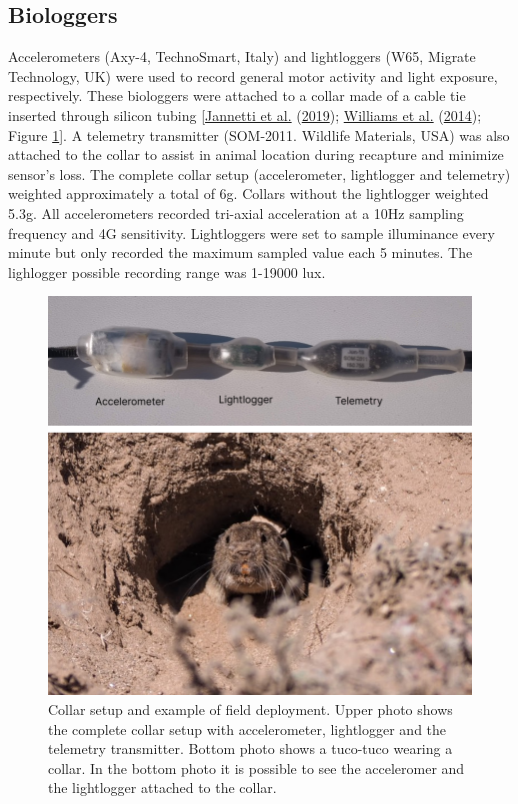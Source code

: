 \documentclass[msc,numbers,hidelinks]{coppe}
\begin{document}
  \hypertarget{biologgers}{%
  \subsection{Biologgers}\label{biologgers}}

  Accelerometers (Axy-4, TechnoSmart, Italy) and lightloggers (W65, Migrate Technology, UK) were used to record general motor activity and light exposure, respectively. These biologgers were attached to a collar made of a cable tie inserted through silicon tubing {[}\protect\hyperlink{ref-jannetti2019}{Jannetti et al.} (\protect\hyperlink{ref-jannetti2019}{2019}); \protect\hyperlink{ref-williams2014}{Williams et al.} (\protect\hyperlink{ref-williams2014}{2014}); Figure \ref{fig:methods-collar}{]}. A telemetry transmitter (SOM-2011. Wildlife Materials, USA) was also attached to the collar to assist in animal location during recapture and minimize sensor's loss. The complete collar setup (accelerometer, lightlogger and telemetry) weighted approximately a total of 6g. Collars without the lightlogger weighted 5.3g. All accelerometers recorded tri-axial acceleration at a 10Hz sampling frequency and 4G sensitivity. Lightloggers were set to sample illuminance every minute but only recorded the maximum sampled value each 5 minutes. The lighlogger possible recording range was 1-19000 lux.
  \begin{figure}

  {\centering \includegraphics[width=1\linewidth]{../04_figures/collar/collar_tuco} 

  }

  \caption{Collar setup and example of field deployment. Upper photo shows the complete collar setup with accelerometer, lightlogger and the telemetry transmitter. Bottom photo shows a tuco-tuco wearing a collar. In the bottom photo it is possible to see the acceleromer and the lightlogger attached to the collar.}\label{fig:methods-collar}
  \end{figure}
\end{document}
